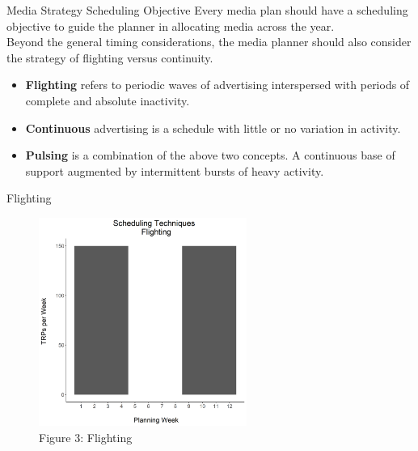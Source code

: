 \documentclass[pdf]{beamer}
\newcommand{\empr}[1]{{\color{franklinblue}\textbf{#1}}}
\theoremstyle{remark}
\theoremstyle{definition}
\begin{document}
\begin{frame}[t]{Media Strategy Scheduling Objective}
Every media plan should have a scheduling objective to guide the planner in allocating media across the year.  \\
\vspace{1.5ex}
Beyond the general timing considerations, the media planner should also consider the strategy of flighting versus continuity.  \\
\vspace{1.5ex}
\begin{itemize}
  \item \empr{Flighting} refers to periodic waves of advertising interspersed with periods of complete and absolute inactivity.
  \item \empr{Continuous} advertising is a schedule with little or no variation in activity.
  \item  \empr{Pulsing} is a combination of the above two concepts.  A continuous base of support augmented by intermittent bursts of heavy activity. 
\end{itemize} 
\end{frame}

\begin{frame}[t]{Flighting}
\begin{figure}[htbp]
  \captionsetup{justification=centering}
  \includegraphics[height=6.8cm, trim=0.3cm 0.3cm 0.3cm 0.3cm width=6.8cm]{../BUSA_603_Ad_Response/Output/m5_0_a.png}
  \caption{Figure {\color{franklinblue} 3}: Flighting}
\end{figure}
\end{frame}
\end{document}
